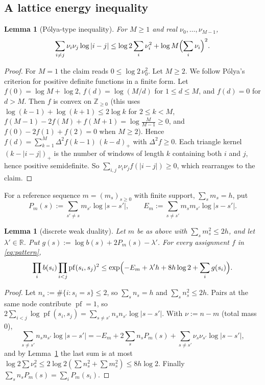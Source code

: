 \documentclass[11pt]{amsart}
\newtheorem{lemma}[theorem]{Lemma}
\theoremstyle{definition}
\theoremstyle{remark}
\numberwithin{equation}{section}
\newcommand{\ZZ}{\mathbb{Z}}
\newcommand{\RR}{\mathbb{R}}
\begin{document}
\subsection{A lattice energy inequality}

\begin{lemma}[P\'olya-type inequality]\label{lem:polya}
For $M\ge1$ and real $\nu_0,\dots,\nu_{M-1}$,
\[
  \sum_{i\ne j}\nu_i\nu_j\log|i-j|\le\log2\sum_i\nu_i^2+\log M\Bigl(\sum_i\nu_i\Bigr)^2 .
\]
\end{lemma}

\begin{proof}
For $M=1$ the claim reads $0\le\log2\,\nu_0^2$. Let $M\ge2$. We follow P\'olya's criterion for positive definite
functions \cite{Polya1949} in a finite form. Let $f(0)=\log M+\log2$, $f(d)=\log(M/d)$ for $1\le d\le M$, and $f(d)=0$
for $d>M$. Then $f$ is convex on
$\ZZ_{\ge0}$ (this uses $\log(k-1)+\log(k+1)\le2\log k$ for $2\le k<M$, $f(M-1)-2f(M)+f(M+1)=\log\frac M{M-1}\ge0$,
and $f(0)-2f(1)+f(2)=0$ when $M\ge2$).
Hence $f(d)=\sum_{k=1}^{M}\Delta^2f(k-1)\,(k-d)_+$ with $\Delta^2f\ge0$. Each triangle kernel $(k-|i-j|)_+$ is the
number of windows of length $k$ containing both $i$ and $j$, hence positive semidefinite. So
$\sum_{i,j}\nu_i\nu_jf(|i-j|)\ge0$, which rearranges to the claim.
\end{proof}

For a reference sequence $m=(m_s)_{s\ge0}$ with finite support, $\sum_sm_s=h$, put
\[
  P_m(s):=\sum_{s'\ne s}m_{s'}\log|s-s'|,\qquad E_m:=\sum_{s\ne s'}m_sm_{s'}\log|s-s'|.
\]

\begin{lemma}[discrete weak duality]\label{lem:dual}
Let $m$ be as above with $\sum_sm_s^2\le2h$, and let $\lambda'\in\RR$. Put $g(s):=\log b(s)+2P_m(s)-\lambda'$. For every assignment $f$ in \eqref{eq:pattern},
\[
  \prod_ib(s_i)\prod_{i<j}\operatorname{pf}(s_i,s_j)^2\le\exp\Bigl(-E_m+\lambda'h+8h\log2+\sum_ig(s_i)\Bigr).
\]
\end{lemma}

\begin{proof}
Let $n_s:=\#\{i:s_i=s\}\le2$, so $\sum_sn_s=h$ and $\sum_sn_s^2\le2h$. Pairs at the same node contribute
$\operatorname{pf}=1$, so $2\sum_{i<j}\log\operatorname{pf}(s_i,s_j)=\sum_{s\ne s'}n_sn_{s'}\log|s-s'|$. With $\nu:=n-m$ (total mass $0$),
\[
  \sum_{s\ne s'}n_sn_{s'}\log|s-s'|=-E_m+2\sum_sn_sP_m(s)+\sum_{s\ne s'}\nu_s\nu_{s'}\log|s-s'| ,
\]
and by Lemma~\ref{lem:polya} the last sum is at most $\log2\sum\nu_s^2\le2\log2(\sum n_s^2+\sum m_s^2)\le8h\log2$.
Finally $\sum_sn_sP_m(s)=\sum_iP_m(s_i)$.
\end{proof}
\end{document}

